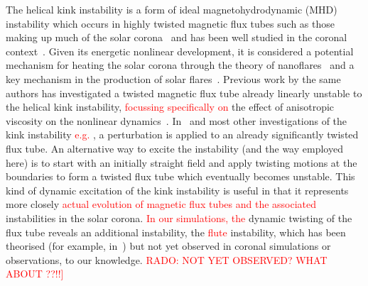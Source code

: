 \documentclass[12pt]{article}
\newcommand{\rs}[2]{\textcolor{red}{#2}}
\begin{document}
The helical kink instability is a form of ideal magnetohydrodynamic
(MHD) instability which occurs in highly twisted magnetic flux tubes
such as those making up much of the solar
corona~\cite{realeCoronalLoopsObservations2014} and has been well
studied in the coronal
context~\cite{hoodKinkInstabilitySolar1979,hoodCoronalHeatingMagnetic2009,browningSolarCoronalHeating2003c,barefordShockHeatingNumerical2015,quinnEffectAnisotropicViscosity2020a}. Given
its energetic nonlinear development, it is considered a potential
mechanism for heating the solar corona through the theory of
nanoflares~\cite{klimchukSolvingCoronalHeating2006a,browningMechanismsSolarCoronal1991}
and a key mechanism in the production of solar
flares~\cite{hoodKinkInstabilitySolar1979}. Previous work by the same
authors has investigated a twisted magnetic flux tube already linearly
unstable to the helical kink instability, \rs{investigating particularly}{focussing specifically on}
the effect of anisotropic viscosity on the nonlinear
dynamics~\cite{quinnEffectAnisotropicViscosity2020a}. In~\cite{quinnEffectAnisotropicViscosity2020a}
and most other investigations of the kink instability
\rs{}{e.g. \cite{hoodCoronalHeatingMagnetic2009}}, a perturbation 
is applied to an already significantly twisted flux tube. An
alternative way to excite the instability (and the way employed here)
is to start with an initially straight field and apply twisting
motions at the boundaries to form a twisted flux tube which eventually
becomes unstable. This kind of dynamic excitation of the kink
instability is useful in that it represents more closely \rs{the real
development of a magnetic flux tube and associated}{actual evolution
  of magnetic flux tubes and the associated} instabilities in 
the solar corona. \rs{The}{In our simulations, the}
dynamic twisting of the flux tube reveals an additional instability,
the \rs{fluting}{flute} instability, which has been theorised (for example,
in~\cite{priestMagnetohydrodynamicsSuna}) but not yet observed in
coronal simulations or observations, to our knowledge. \rs{}{RADO: NOT
  YET OBSERVED? 
  WHAT ABOUT \cite{terradasEffectMagneticTwist2018,rudermanNonlinearGenerationFluting2017a}??!!]}  
\end{document}
